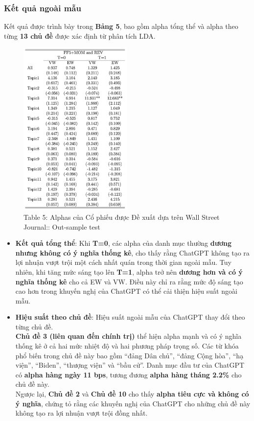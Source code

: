 \documentclass[a4paper,12pt]{article}
\begin{document}
\subsubsection{Kết quả ngoài mẫu}
Kết quả được trình bày trong \textbf{Bảng 5}, bao gồm alpha tổng thể và alpha theo từng \textbf{13 chủ đề} được xác định từ phân tích LDA.
\begin{figure}[H]
    \centering
    \includegraphics[width=0.5\textwidth]{table/tab5.png}
    \caption*{Table 5: Alphas của Cổ phiếu được Đề xuất dựa trên Wall Street Journal:: Out-sample test}
    \label{fig:fig2}
\end{figure}
\begin{itemize}
    \item \textbf{Kết quả tổng thể}: Khi \textbf{T=0}, các alpha của danh mục thường \textbf{dương nhưng không có ý nghĩa thống kê}, cho thấy rằng ChatGPT không tạo ra lợi nhuận vượt trội một cách nhất quán trong thời gian ngoài mẫu. Tuy nhiên, khi tăng mức sáng tạo lên \textbf{T=1}, alpha trở nên \textbf{dương hơn và có ý nghĩa thống kê} cho cả EW và VW. Điều này chỉ ra rằng mức độ sáng tạo cao hơn trong khuyến nghị của ChatGPT có thể cải thiện hiệu suất ngoài mẫu.
    \item \textbf{Hiệu suất theo chủ đề}: Hiệu suất ngoài mẫu của ChatGPT thay đổi theo từng chủ đề. \\
    \textbf{Chủ đề 3 (liên quan đến chính trị)} thể hiện alpha mạnh và có ý nghĩa thống kê ở cả hai mức nhiệt độ và hai phương pháp trọng số. Các từ khóa phổ biến trong chủ đề này bao gồm ``đảng Dân chủ'', ``đảng Cộng hòa'', ``hạ viện'', ``Biden'', ``thượng viện'' và ``bầu cử''. Danh mục đầu tư của ChatGPT có \textbf{alpha hàng ngày 11 bps}, tương đương \textbf{alpha hàng tháng 2.2\%} cho chủ đề này.\\
    Ngược lại, \textbf{Chủ đề 2} và \textbf{Chủ đề 10} cho thấy \textbf{alpha tiêu cực và không có ý nghĩa}, chứng tỏ rằng các khuyến nghị của ChatGPT cho những chủ đề này không tạo ra lợi nhuận vượt trội đồng nhất.
\end{itemize}
\end{document}
